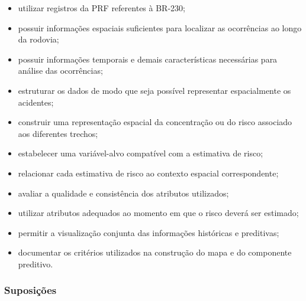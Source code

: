 \documentclass[11pt,a4paper]{article}
\begin{document}
\begin{itemize}

    \item utilizar registros da PRF referentes à BR-230;

    \item possuir informações espaciais suficientes para localizar as ocorrências ao longo da rodovia;

    \item possuir informações temporais e demais características necessárias para análise das ocorrências;

    \item estruturar os dados de modo que seja possível representar espacialmente os acidentes;

    \item construir uma representação espacial da concentração ou do risco associado aos diferentes trechos;

    \item estabelecer uma variável-alvo compatível com a estimativa de risco;

    \item relacionar cada estimativa de risco ao contexto espacial correspondente;

    \item avaliar a qualidade e consistência dos atributos utilizados;

    \item utilizar atributos adequados ao momento em que o risco deverá ser estimado;

    \item permitir a visualização conjunta das informações históricas e preditivas;

    \item documentar os critérios utilizados na construção do mapa e do componente preditivo.

\end{itemize}

\subsubsection*{Suposições}
\end{document}
